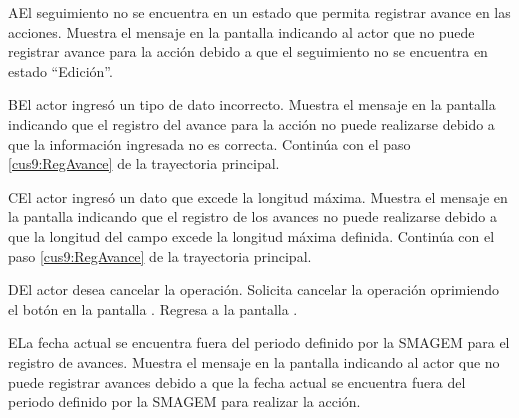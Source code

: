\begin{UCtrayectoriaA}{A}{El seguimiento no se encuentra en un estado que permita registrar avance en las acciones.}
    \UCpaso[\UCsist] Muestra el mensaje  en la pantalla  indicando al actor que no puede registrar avance para la acción debido a que el seguimiento no se encuentra en estado ``Edición''. 
\end{UCtrayectoriaA}
 
    \begin{UCtrayectoriaA}{B}{El actor ingresó un tipo de dato incorrecto.}    
    \UCpaso[\UCsist] Muestra el mensaje  en la pantalla  indicando que el registro del avance para la acción no puede realizarse debido a que la información ingresada no es correcta.
    \UCpaso[] Continúa con el paso \ref{cus9:RegAvance} de la trayectoria principal.     
    \end{UCtrayectoriaA}
    
    \begin{UCtrayectoriaA}{C}{El actor ingresó un dato que excede la longitud máxima.}    
    \UCpaso[\UCsist] Muestra el mensaje  en la pantalla  indicando que el registro de los avances no puede realizarse debido a que la longitud del campo excede la longitud máxima definida.
    \UCpaso[] Continúa con el paso \ref{cus9:RegAvance} de la trayectoria principal.     
    \end{UCtrayectoriaA}
 
    \begin{UCtrayectoriaA}{D}{El actor desea cancelar la operación.}
      \UCpaso[\UCactor] Solicita cancelar la operación oprimiendo el botón  en la pantalla .
      \UCpaso[\UCsist] Regresa a la pantalla . 
    \end{UCtrayectoriaA}

    \begin{UCtrayectoriaA}{E}{La fecha actual se encuentra fuera del periodo definido por la SMAGEM para el registro de avances.}
    \UCpaso[\UCsist] Muestra el mensaje  en la pantalla  indicando al actor que no puede registrar avances debido a que la fecha actual se encuentra fuera del periodo definido por la SMAGEM para realizar la acción. 
    \end{UCtrayectoriaA}
